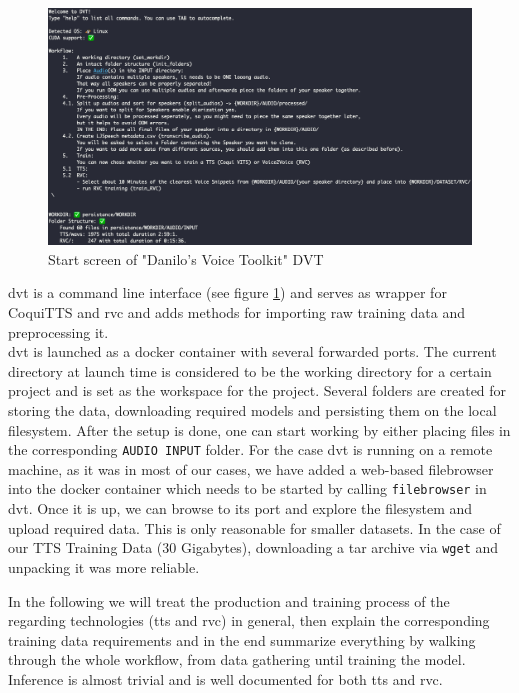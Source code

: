 \documentclass[
  a4paper,  %
  twoside,  %
  bibliography=totoc,
  headsepline,
  cleardoublepage=empty,
  parskip=half,
  draft=false
]{scrbook}
\begin{document}
\begin{figure}[h]
  \centering
  \includegraphics[width=1\textwidth]{./graphics/images/dvt-screen.png}
  \caption{Start screen of "Danilo's Voice Toolkit" DVT}
  \label{fig:dvt-interface}
\end{figure}

\gls{dvt} is a command line interface (see figure \ref{fig:dvt-interface}) and serves as wrapper for CoquiTTS and \gls{rvc} and adds methods for importing raw training data and preprocessing it. \\
\gls{dvt} is launched as a docker container with several forwarded ports. The current directory at launch time is considered to be the working directory for a certain project and is set as the workspace for the project. Several folders are created for storing the data, downloading required models and persisting them on the local filesystem. After the setup is done, one can start working by either placing files in the corresponding \verb|AUDIO INPUT| folder. For the case \gls{dvt} is running on a remote machine, as it was in most of our cases, we have added a web-based filebrowser into the docker container which needs to be started by calling \verb|filebrowser| in \gls{dvt}. Once it is up, we can browse to its port and explore the filesystem and upload required data. This is only reasonable for smaller datasets. In the case of our TTS Training Data (30 Gigabytes), downloading a tar archive via \verb|wget| and unpacking it was more reliable. 

In the following we will treat the production and training process of the regarding technologies (\gls{tts} and \gls{rvc}) in general, then explain the corresponding training data requirements and in the end summarize everything by walking through the whole workflow, from data gathering until training the model. Inference is almost trivial and is well documented for both \gls{tts} and \gls{rvc}.
\end{document}
